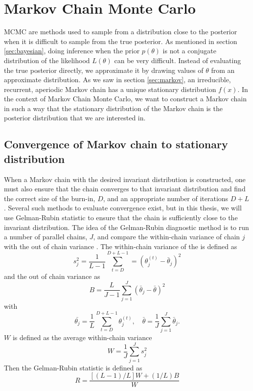 \section{Markov Chain Monte Carlo}
MCMC are  methods used to sample from a distribution close to the posterior when it is difficult to sample from the true posterior. As mentioned in section \ref{sec:bayesian}, 
doing inference when the prior $p\left(\theta\right)$ is not a conjugate distribution of the likelihood $L\left(\theta\right)$ can be very difficult.
Instead of evaluating the true posterior directly, we approximate it by drawing values of $\theta$ from an approximate distribution. 
As we saw in  section \ref{sec:markov}, an irreducible, recurrent, aperiodic Markov chain has a unique stationary distribution $f(x)$.
In the context of Markov Chain Monte Carlo, we want to construct a Markov chain in such a way that the stationary distribution of the Markov chain is the posterior distribution that we are interested in. 
\subsection{Convergence of Markov chain to stationary distribution}\label{sec:convergence}
When a Markov chain with the desired invariant distribution is constructed, one must also ensure that the chain converges to that invariant distribution and find the correct size of the burn-in, $D$, and an appropriate number of iterations $D+L$. Several such methods to evaluate convergence exist, but in this thesis, we will use Gelman-Rubin statistic to ensure that the chain is sufficiently close to the invariant distribution. The idea of the Gelman-Rubin diagnostic method is to run a number of parallel chains, $J$, and compare the within-chain variance of chain $j$ with the out of chain variance \cite{CS}. The within-chain variance of the is defined as 
\begin{equation*}
    s_j^2 = \frac{1}{L-1}\sum_{t = D}^{D + L - 1} = \left(\theta_j^{\left(t\right)} - \bar{\theta}_j\right)^2
\end{equation*}
and the out of chain variance as 
\begin{equation*}
    B = \frac{L}{J-1}\sum_{j=1}^J \left(\bar{\theta}_j - \bar{\theta}\right)^2
\end{equation*}
with 
\begin{equation*}
    \bar{\theta_j} = \frac{1}{L}\sum_{t = D}^{D+L-1} \theta_j^{\left(t\right)}, \quad \bar{\theta} = \frac{1}{J} \sum_{j=1}^J \bar{\theta}_j.
\end{equation*} 
$W$ is defined as the average within-chain variance 
\begin{equation*}
    W = \frac{1}{J} \sum_{j = 1}^J{s_j^2}
\end{equation*}
Then the Gelman-Rubin statistic is defined as 
\begin{equation}\label{eq:Gelman-Rubin}
    R = \frac{\left[\left(L-1\right)/L\right]W + \left(1/L\right)B}{W}
\end{equation}

